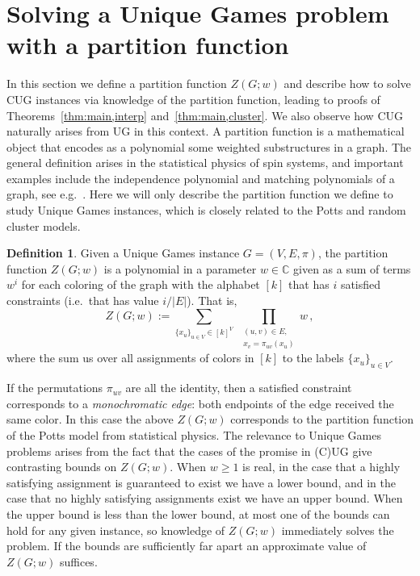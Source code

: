 \documentclass[10pt,a4paper]{article}
\theoremstyle{definition}
\newtheorem{definition}[theorem]{Definition}
\newcommand*{\CC}{\mathbb{C}}
\begin{document}
\section{Solving a Unique Games problem with a partition function}\label{sec:solveCUG}
%
In this section we define a partition function $Z(G;w)$ and describe how to solve CUG instances via knowledge of the partition function, leading to proofs of Theorems~\ref{thm:main,interp} and~\ref{thm:main,cluster}. 
We also observe how CUG naturally arises from UG in this context. 
%
A partition function is a mathematical object that encodes as a polynomial some weighted substructures in a graph. 
The general definition arises in the statistical physics of spin systems, and important examples include the independence polynomial and matching polynomials of a graph, see e.g.~\cite{Barvinok16}. 
Here we will only describe the partition function we define to study Unique Games instances, which is closely related to the Potts and random cluster models.
%
\begin{definition}\label{def:Z}
Given a Unique Games instance $G=(V, E, \pi)$, the partition function $Z(G;w)$ is a polynomial in a parameter $w\in\CC$ given as a sum of terms $w^{i}$ for each coloring of the graph with the alphabet $[k]$ that has $i$ satisfied constraints (i.e.\ that has value $i/|E|$).
That is,
\begin{equation}
Z(G; w) := \sum_{\{x_u\}_{u\in V}\in[k]^V}\;\prod_{\substack{(u,v)\in E,\\ x_v=\pi_{uv}(x_u)}}w\,,
\end{equation}
where the sum us over all assignments of colors in $[k]$ to the labels $\{x_u\}_{u\in V}$.
\end{definition}
%
If the permutations $\pi_{uv}$ are all the identity, then a satisfied constraint corresponds to a \emph{monochromatic edge}: both endpoints of the edge received the same color. 
In this case the above $Z(G;w)$ corresponds to the partition function of the Potts model from statistical physics. 
The relevance to Unique Games problems arises from the fact that the cases of the promise in (C)UG give contrasting bounds on $Z(G;w)$. 
When $w\ge 1$ is real, in the case that a highly satisfying assignment is guaranteed to exist we have a lower bound, and in the case that no highly satisfying assignments exist we have an upper bound. 
When the upper bound is less than the lower bound, at most one of the bounds can hold for any given instance, so knowledge of $Z(G;w)$ immediately solves the problem. 
If the bounds are sufficiently far apart an approximate value of $Z(G;w)$ suffices.  
\end{document}
